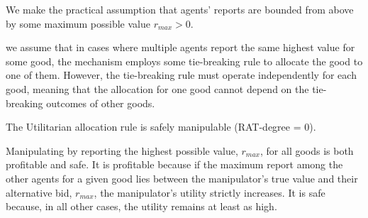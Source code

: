 We make the practical assumption that agents’ reports are bounded from above by some maximum possible value $r_{max} >0$.

we assume that in cases where multiple agents report the same highest value for some good, the mechanism employs some tie-breaking rule to allocate the good to one of them.
However, the tie-breaking rule must operate independently for each good, meaning that the allocation for one good cannot depend on the tie-breaking outcomes of other goods.



\begin{theoremrep}
\label{prop:auction-knownagents}
The Utilitarian allocation rule is safely manipulable (RAT-degree = 0).
\end{theoremrep}

\begin{proofsketch}
    Manipulating by reporting the highest possible value, $r_{max}$, for all goods is both profitable and safe. It is profitable because if the maximum report among the other agents for a given good lies between the manipulator's true value and their alternative bid, $r_{max}$, the manipulator's utility strictly increases. It is safe because, in all other cases, the utility remains at least as high.
\end{proofsketch}


